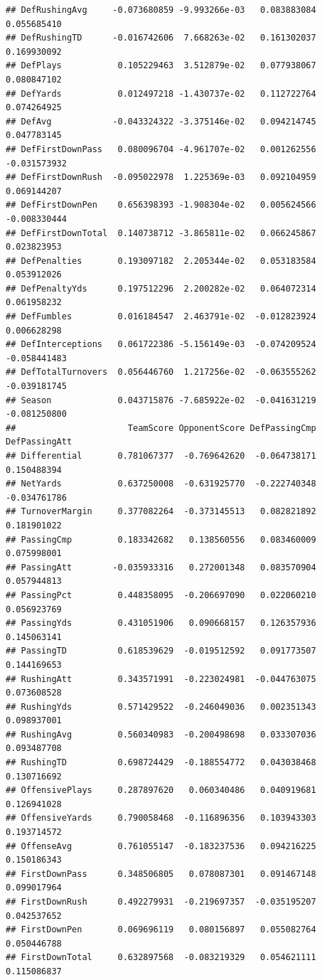\documentclass[
]{book}
\begin{document}
\begin{verbatim}
## DefRushingAvg     -0.073680859 -9.993266e-03   0.083883084    0.055685410
## DefRushingTD      -0.016742606  7.668263e-02   0.161302037    0.169930092
## DefPlays           0.105229463  3.512879e-02   0.077938067    0.080847102
## DefYards           0.012497218 -1.430737e-02   0.112722764    0.074264925
## DefAvg            -0.043324322 -3.375146e-02   0.094214745    0.047783145
## DefFirstDownPass   0.080096704 -4.961707e-02   0.001262556   -0.031573932
## DefFirstDownRush  -0.095022978  1.225369e-03   0.092104959    0.069144207
## DefFirstDownPen    0.656398393 -1.908304e-02   0.005624566   -0.008330444
## DefFirstDownTotal  0.140738712 -3.865811e-02   0.066245867    0.023823953
## DefPenalties       0.193097182  2.205344e-02   0.053183584    0.053912026
## DefPenaltyYds      0.197512296  2.200282e-02   0.064072314    0.061958232
## DefFumbles         0.016184547  2.463791e-02  -0.012823924    0.006628298
## DefInterceptions   0.061722386 -5.156149e-03  -0.074209524   -0.058441483
## DefTotalTurnovers  0.056446760  1.217256e-02  -0.063555262   -0.039181745
## Season             0.043715876 -7.685922e-02  -0.041631219   -0.081250800
##                      TeamScore OpponentScore DefPassingCmp DefPassingAtt
## Differential       0.781067377  -0.769642620  -0.064738171   0.150488394
## NetYards           0.637250008  -0.631925770  -0.222740348  -0.034761786
## TurnoverMargin     0.377082264  -0.373145513   0.082821892   0.181901022
## PassingCmp         0.183342682   0.138560556   0.083460009   0.075998001
## PassingAtt        -0.035933316   0.272001348   0.083570904   0.057944813
## PassingPct         0.448358095  -0.206697090   0.022060210   0.056923769
## PassingYds         0.431051906   0.090668157   0.126357936   0.145063141
## PassingTD          0.618539629  -0.019512592   0.091773507   0.144169653
## RushingAtt         0.343571991  -0.223024981  -0.044763075   0.073608528
## RushingYds         0.571429522  -0.246049036   0.002351343   0.098937001
## RushingAvg         0.560340983  -0.200498698   0.033307036   0.093487708
## RushingTD          0.698724429  -0.188554772   0.043038468   0.130716692
## OffensivePlays     0.287897620   0.060340486   0.040919681   0.126941028
## OffensiveYards     0.790058468  -0.116896356   0.103943303   0.193714572
## OffenseAvg         0.761055147  -0.183237536   0.094216225   0.150186343
## FirstDownPass      0.348506805   0.078087301   0.091467148   0.099017964
## FirstDownRush      0.492279931  -0.219697357  -0.035195207   0.042537652
## FirstDownPen       0.069696119   0.080156897   0.055082764   0.050446788
## FirstDownTotal     0.632897568  -0.083219329   0.054621111   0.115086837

\end{verbatim}
\end{document}
